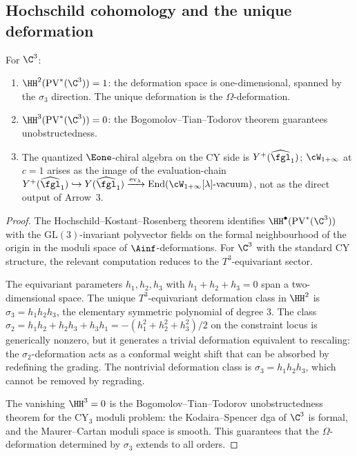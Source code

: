 \subsection{Hochschild cohomology and the unique deformation}
\label{subsec:hochschild-unique-deformation}

\begin{theorem}
\label{thm:c3-hochschild}
For $\C^3$:
\begin{enumerate}[label=\textup{(\roman*)}]
 \item $\HH^2(\mathrm{PV}^*(\C^3)) = 1$: the deformation space is one-dimensional, spanned by the $\sigma_3$ direction. The unique deformation is the $\Omega$-deformation.
 \item $\HH^3(\mathrm{PV}^*(\C^3)) = 0$: the Bogomolov--Tian--Todorov theorem guarantees unobstructedness.
 \item The quantized $\Eone$-chiral algebra on the CY side is $Y^+(\widehat{\fgl}_1)$; $\cW_{1+\infty}$ at $c = 1$ arises as the image of the evaluation-chain $Y^+(\widehat{\fgl}_1) \hookrightarrow Y(\widehat{\fgl}_1) \xrightarrow{\mathrm{ev}_\lambda} \mathrm{End}(\cW_{1+\infty}[\lambda]\text{-vacuum})$, not as the direct output of Arrow~3.
\end{enumerate}
\end{theorem}

\begin{proof}
The Hochschild--Kostant--Rosenberg theorem identifies $\HH^\bullet(\mathrm{PV}^*(\C^3))$ with the $\mathrm{GL}(3)$-invariant polyvector fields on the formal neighbourhood of the origin in the moduli space of $\Ainf$-deformations. For $\C^3$ with the standard CY structure, the relevant computation reduces to the $T^3$-equivariant sector.

The equivariant parameters $h_1, h_2, h_3$ with $h_1 + h_2 + h_3 = 0$ span a two-dimensional space. The unique $T^3$-equivariant deformation class in $\HH^2$ is $\sigma_3 = h_1 h_2 h_3$, the elementary symmetric polynomial of degree $3$. The class $\sigma_2 = h_1 h_2 + h_2 h_3 + h_3 h_1 = -(h_1^2+h_2^2+h_3^2)/2$ on the constraint locus is generically nonzero, but it generates a trivial deformation equivalent to rescaling: the $\sigma_2$-deformation acts as a conformal weight shift that can be absorbed by redefining the grading. The nontrivial deformation class is $\sigma_3 = h_1 h_2 h_3$, which cannot be removed by regrading.

The vanishing $\HH^3 = 0$ is the Bogomolov--Tian--Todorov unobstructedness theorem for the CY$_3$ moduli problem: the Kodaira--Spencer dga of $\C^3$ is formal, and the Maurer--Cartan moduli space is smooth. This guarantees that the $\Omega$-deformation determined by $\sigma_3$ extends to all orders.
\end{proof}



